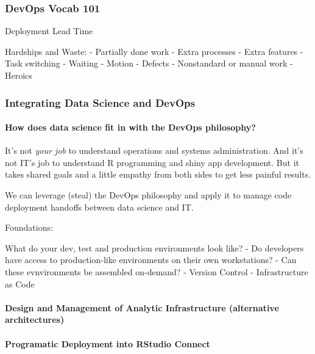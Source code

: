 \documentclass[]{book}
\let\oldparagraph\paragraph
\renewcommand{\paragraph}[1]{\oldparagraph{#1}\mbox{}}
\theoremstyle{definition}
\theoremstyle{definition}
\theoremstyle{definition}
\theoremstyle{remark}
\begin{document}
\hypertarget{devops-vocab-101}{%
\subsubsection{DevOps Vocab 101}\label{devops-vocab-101}}

Deployment Lead Time

Hardships and Waste: - Partially done work - Extra processes - Extra
features - Task switching - Waiting - Motion - Defects - Nonstandard or
manual work - Heroics

\hypertarget{integrating-data-science-and-devops}{%
\subsubsection{Integrating Data Science and
DevOps}\label{integrating-data-science-and-devops}}

\hypertarget{how-does-data-science-fit-in-with-the-devops-philosophy}{%
\paragraph{How does data science fit in with the DevOps
philosophy?}\label{how-does-data-science-fit-in-with-the-devops-philosophy}}

It's not \emph{your job} to understand operations and systems
administration. And it's not IT's job to understand R programming and
shiny app development. But it takes shared goals and a little empathy
from both sides to get less painful results.

We can leverage (steal) the DevOps philosophy and apply it to manage
code deployment handoffs between data science and IT.

Foundations:

What do your dev, test and production environments look like? - Do
developers have access to production-like environments on their own
workstations? - Can these evnvironments be assembled on-demand? -
Version Control - Infrastructure as Code

\hypertarget{design-and-management-of-analytic-infrastructure-alternative-architectures}{%
\paragraph{Design and Management of Analytic Infrastructure (alternative
architectures)}\label{design-and-management-of-analytic-infrastructure-alternative-architectures}}

\hypertarget{programatic-deployment-into-rstudio-connect}{%
\paragraph{Programatic Deployment into RStudio
Connect}\label{programatic-deployment-into-rstudio-connect}}
\end{document}
